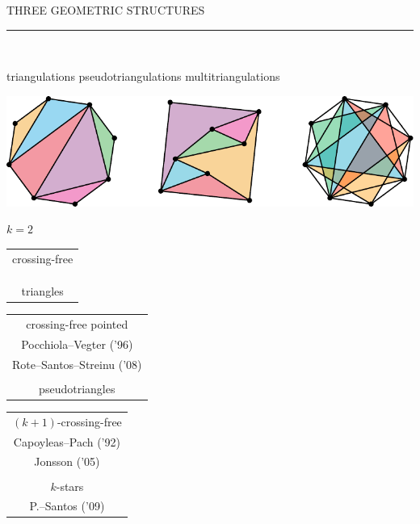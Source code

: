 \documentclass[12pt,titlepage,landscape,a4paper]{article}
\newcommand{\textemoyen}{\fontsize{23}{27}\selectfont}
\newenvironment{slide}[1]
{
\newpage
\begin{center}
{\blue \textemoyen \uppercase{#1}}\\
\end{center}
\vspace{-1cm}
\rule{\textwidth}{0.5 pt}\\
\vspace{-.8cm}
}
{\vspace*{-3cm}}
\newcommand{\violet}{\color{violet}} %
\newcommand{\blue}{\color{blue}} %
\newcommand{\papier}[1]{{\violet\fontsize{15}{20}\selectfont #1}} %
\begin{document}
\begin{slide}{Three geometric structures}

\hspace{1.6cm} triangulations \hspace{3.4cm} pseudotriangulations \hspace{2.5cm} multitriangulations\\
\begin{center}\includegraphics[scale=1.9]{geometricStructures2}\end{center}
\vspace{-1.08cm} \hspace*{25.7cm} ${k=2}$

\hspace{1.7cm} 
\begin{tabular}[t]{c} crossing-free \\ \\[-.3cm] \\ \\ triangles \end{tabular} 
\hspace{3.4cm} 
\begin{tabular}[t]{c} crossing-free pointed \\ \papier{Pocchiola--Vegter ('96)} \\[-.3cm] \papier{Rote--Santos--Streinu ('08)} \\ \\ pseudotriangles \end{tabular}
\hspace{2cm} 
\begin{tabular}[t]{c} $(k+1)$-crossing-free \\ \papier{Capoyleas--Pach ('92)} \\[-.3cm] \papier{Jonsson ('05)} \\ \\ $k$-stars \\ \papier{P.--Santos ('09)} \end{tabular}

\end{slide}

\end{document}
